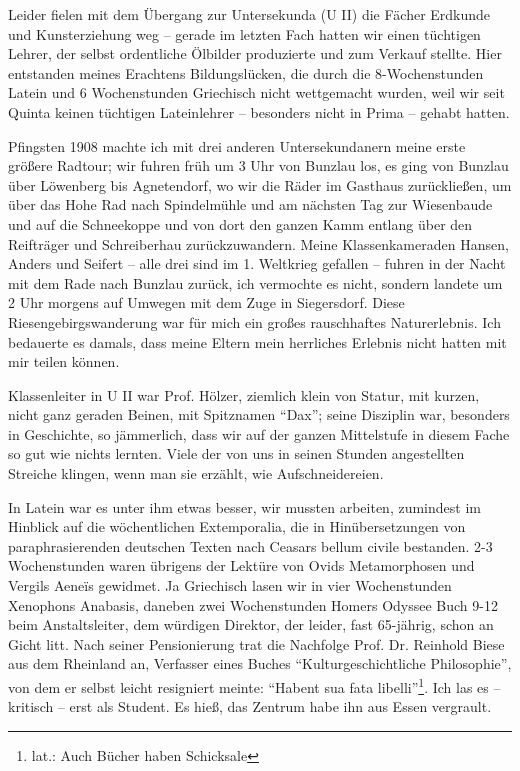 Leider fielen mit dem Übergang zur Untersekunda (U II) die Fächer Erdkunde und Kunsterziehung weg -- gerade im letzten Fach hatten wir einen tüchtigen Lehrer, der selbst ordentliche Ölbilder produzierte und zum Verkauf stellte. Hier entstanden meines Erachtens Bildungslücken, die durch die 8-Wochenstunden Latein und 6 Wochenstunden Griechisch nicht wettgemacht wurden, weil wir seit Quinta keinen tüchtigen Lateinlehrer -- besonders nicht in Prima -- gehabt hatten.

Pfingsten 1908 machte ich mit drei anderen Untersekundanern meine erste größere Radtour; wir fuhren früh um 3 Uhr von Bunzlau los, es ging von Bunzlau über Löwenberg bis Agnetendorf, wo wir die Räder im Gasthaus zurückließen, um über das Hohe Rad nach Spindelmühle und am nächsten Tag zur Wiesenbaude und auf die Schneekoppe und von dort den ganzen Kamm entlang über den Reifträger und Schreiberhau zurückzuwandern. Meine Klassenkameraden Hansen, Anders und Seifert -- alle drei sind im 1. Weltkrieg gefallen -- fuhren in der Nacht mit dem Rade nach Bunzlau zurück, ich vermochte es nicht, sondern landete um 2 Uhr morgens auf Umwegen mit dem Zuge in Siegersdorf. Diese Riesengebirgswanderung war für mich ein großes rauschhaftes Naturerlebnis. Ich bedauerte es damals, dass meine Eltern mein herrliches Erlebnis nicht hatten mit mir teilen können.

Klassenleiter in U II war Prof. Hölzer, ziemlich klein von Statur, mit kurzen, nicht ganz geraden Beinen, mit Spitznamen \enquote{Dax}; seine Disziplin war, besonders in Geschichte, so jämmerlich, dass wir auf der ganzen Mittelstufe in diesem Fache so gut wie nichts lernten. Viele der von uns in seinen Stunden angestellten Streiche klingen, wenn man sie erzählt, wie Aufschneidereien.

In Latein war es unter ihm etwas besser, wir mussten arbeiten, zumindest im Hinblick auf die wöchentlichen Extemporalia, die in Hinübersetzungen von paraphrasierenden deutschen Texten nach Ceasars bellum civile bestanden. 2-3 Wochenstunden waren übrigens der Lektüre von Ovids Metamorphosen und Vergils Aeneïs gewidmet. Ja Griechisch lasen wir in vier Wochenstunden Xenophons Anabasis, daneben zwei Wochenstunden Homers Odyssee Buch 9-12 beim Anstaltsleiter, dem würdigen Direktor, der leider, fast 65-jährig, schon an Gicht litt. Nach seiner Pensionierung trat die Nachfolge Prof. Dr. Reinhold Biese aus dem Rheinland an, Verfasser eines Buches \enquote{Kulturgeschichtliche Philosophie}, von dem er selbst leicht resigniert meinte: \enquote{Habent sua fata libelli}\footnote{lat.: Auch Bücher haben Schicksale}. Ich las es -- kritisch -- erst als Student. Es hieß, das Zentrum habe ihn aus Essen vergrault.

